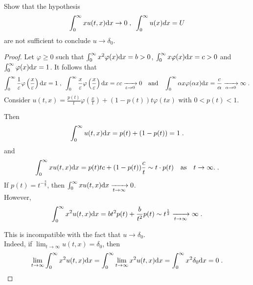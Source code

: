 \documentclass[11pt]{amsart}
\newcommand{\tendsto}[1]{\xrightarrow[#1]{}}
\begin{document}
\begin{remark}
    Show that the hypothesis 
        \begin{equation*}
            \int_0^\infty xu(t,x) \mathrm dx \to 0 \; , \enspace \int_0^\infty u(x) dx = U
        \end{equation*}
    are not sufficient to conclude $u \to \delta_0$.
\end{remark}
\begin{proof}
Let $\varphi \geq 0$ such that $\int_0^\infty x^2 \varphi(x) \mathrm dx = b > 0$,  $\int_0^\infty x \varphi(x) \mathrm dx =c > 0$ and $\int_0^\infty \varphi (x) \mathrm dx = 1$.
It follows that
    \begin{equation*}
        \int_0^\infty \frac{1}{\varepsilon} \varphi \left( \frac{x}{\varepsilon} \right) \mathrm dx = 1
        \; , \enspace
        \int_0^\infty \frac{x}{\varepsilon} \varphi \left( \frac{x}{\varepsilon} \right) \mathrm dx = \varepsilon c \xrightarrow[\varepsilon \to 0]{} 0
        \quad \text{and} \quad
        \int_0^\infty \alpha x \varphi (\alpha x) \mathrm dx = \frac{c}{\alpha} \xrightarrow[\alpha \to 0]{} \infty
        \; .
    \end{equation*}
Consider $u(t,x) = \frac{p(t)}{t}  \varphi \left( \frac{x}{t} \right) + (1-p(t)) t \varphi(tx)$ with $0 < p(t) < 1$.

Then 
    \begin{equation*}
        \int_0^\infty u(t,x) \mathrm dx = p(t) + (1-p(t)) = 1
        \; .
    \end{equation*}
and
    \begin{equation*}
        \int_0^\infty x u(t,x) \mathrm dx = p(t) tc + (1-p(t)) \frac{c}{t} \sim t \cdot p(t) \quad \text{as} \quad t \to \infty.
        \; .
    \end{equation*}
If $p(t) = t^{-\frac{3}{2}}$, then $ \int_0^\infty x u(t,x) \dx \tendsto{t \to \infty} 0$. \\

However,
    \begin{equation*}
        \int_0^\infty x^2 u(t,x) \dx 
        =  b t^2 p(t)  +  \frac{b}{t^2} p(t)
        \sim t^{\frac{1}{2}} \tendsto{t \to \infty} \infty
        \eqfinp
    \end{equation*}
    
This is incompatible with the fact that $u \to \delta_0$.\\

Indeed, if $\lim_{t \to \infty}   u(t,x) = \delta_0$, then 
    \begin{equation*}\lim_{t \to \infty}  \int_0^\infty x^2 u(t,x) \mathrm dx =   \int_0^\infty \lim_{t \to \infty}  x^2 u(t,x) \mathrm dx  =  \int_0^\infty x^2 \delta_0 \mathrm dx = 0
    \; .
    \end{equation*}
\end{proof}
\end{document}
